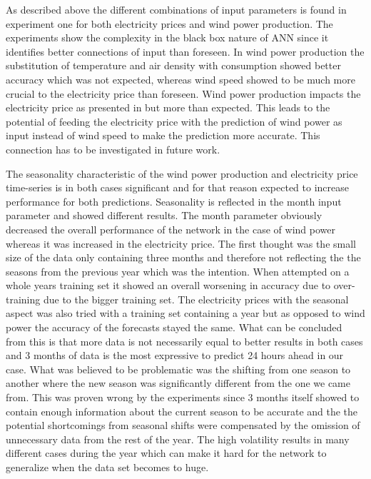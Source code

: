 As described above the different combinations of input parameters is found in experiment one for both electricity prices and wind power production. The experiments show the complexity in the black box nature of ANN since it identifies better connections of input than foreseen. In wind power production the substitution of temperature and air density with consumption showed better accuracy which was not expected, whereas wind speed showed to be much more crucial to the electricity price than foreseen. Wind power production impacts the electricity price as presented in \cite{dayAheadImpactOfWindPowerForecasts} but more than expected. This leads to the potential of feeding the electricity price with the prediction of wind power as input instead of wind speed to make the prediction more accurate. This connection has to be investigated in future work.

The seasonality characteristic of the wind power production and electricity price time-series is in both cases significant and for that reason expected to increase performance for both predictions. Seasonality is reflected in the month input parameter and showed different results. The month parameter obviously decreased the overall performance of the network in the case of wind power whereas it was increased in the electricity price. The first thought was the small size of the data only containing three months and therefore not reflecting the the seasons from the previous year which was the intention. When attempted on a whole years training set it showed an overall worsening in accuracy due to over-training due to the bigger training set. The electricity prices with the seasonal aspect was also tried with a training set containing a year but as opposed to wind power the accuracy of the forecasts stayed the same. What can be concluded from this is that more data is not necessarily equal to better results in both cases and 3 months of data is the most expressive to predict 24 hours ahead in our case. What was believed to be problematic was the shifting from one season to another where the new season was significantly different from the one we came from. This was proven wrong by the experiments since 3 months itself showed to contain enough information about the current season to be accurate and the the potential shortcomings from seasonal shifts were compensated by the omission of unnecessary data from the rest of the year. The high volatility results in many different cases during the year which can make it hard for the network to generalize when the data set becomes to huge.

